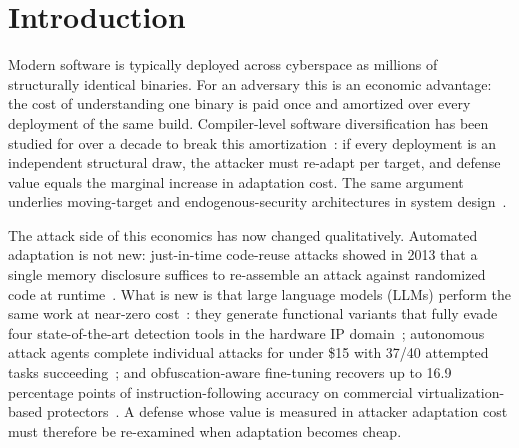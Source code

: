 \documentclass[5p,times,authoryear]{elsarticle}
\theoremstyle{plain}
\theoremstyle{definition}
\theoremstyle{remark}
\begin{document}

\section{Introduction}

Modern software is typically deployed across cyberspace as millions of
structurally identical binaries. For an adversary this is an economic
advantage: the cost of understanding one binary is paid once and amortized over
every deployment of the same build. Compiler-level software diversification
has been studied for over a decade to break this
amortization~\cite{bib2,franz2010unibus,homescu2013librando,crane2015readactor}:
if every deployment is an independent structural draw, the attacker must
re-adapt per target, and defense value equals the marginal increase in
adaptation cost. The same argument underlies moving-target and
endogenous-security architectures in system design~\cite{bib1}.

The attack side of this economics has now changed qualitatively. Automated
adaptation is not new: just-in-time code-reuse attacks showed in 2013 that a
single memory disclosure suffices to re-assemble an attack against randomized
code at runtime~\cite{snow2013jitrop}. What is new is that large language
models (LLMs) perform the same work at near-zero
cost~\cite{pearce2022asleep,perry2023users}: they generate functional variants
that fully evade four state-of-the-art detection tools in the hardware IP
domain~\cite{gohil2025llmpirate}; autonomous attack agents complete individual
attacks for under \$15 with 37/40 attempted tasks
succeeding~\cite{singer2026incalmo}; and obfuscation-aware fine-tuning
recovers up to 16.9 percentage points of instruction-following accuracy on
commercial virtualization-based protectors~\cite{wang2026oasif}. A defense
whose value is measured in attacker adaptation cost must therefore be
re-examined when adaptation becomes cheap.
\end{document}
